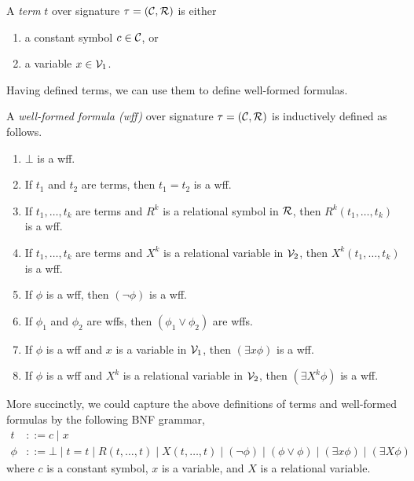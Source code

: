 \documentclass[11pt,twoside=off,numbers=noenddot]{scrbook}
\begin{document}
\begin{definition}
  A \emph{term} $t$ over signature $\tau = (\mathcal{C}, \mathcal{R})$ is either
  \begin{enumerate}
    \item a constant symbol $c \in \mathcal{C}$, or
    \item a variable $x \in \mathcal{V}_1$.
  \end{enumerate}
\end{definition}

Having defined terms, we can use them to define well-formed formulas.

\begin{definition}
  A \emph{well-formed formula (wff)} over signature $\tau = (\mathcal{C}, \mathcal{R})$ is inductively defined as follows.
  \begin{enumerate}
    \item $\bot$ is a wff.
    \item If $t_1$ and $t_2$ are terms, then $t_1 = t_2$ is a wff.
    \item If $t_1, \dots, t_k$ are terms and $R^k$ is a relational symbol in $\mathcal{R}$, then $R^k(t_1, \dots, t_k)$ is a wff.
    \item If $t_1, \dots, t_k$ are terms and $X^k$ is a relational variable in $\mathcal{V}_2$, then $X^k(t_1, \dots, t_k)$ is a wff.
    \item If $\phi$ is a wff, then $(\neg \phi)$ is a wff.
    \item If $\phi_1$ and $\phi_2$ are wffs, then $(\phi_1 \vee \phi_2)$ are wffs.
    \item If $\phi$ is a wff and $x$ is a variable in $\mathcal{V}_1$, then $(\exists x \phi)$ is a wff.
    \item If $\phi$ is a wff and $X^k$ is a relational variable in $\mathcal{V}_2$, then $(\exists X^k \phi)$ is a wff.
  \end{enumerate}
\end{definition}

More succinctly, we could capture the above definitions of terms and well-formed formulas by the following BNF grammar,
\begin{align*}
  t & ::= c \mid x \\
  \phi & ::= \bot \mid t = t \mid R(t, \dots, t) \mid X(t, \dots, t) \mid (\neg \phi) \mid (\phi \vee \phi) \mid (\exists x \phi) \mid (\exists X \phi)
\end{align*}
where $c$ is a constant symbol, $x$ is a variable, and $X$ is a relational variable.
\end{document}
